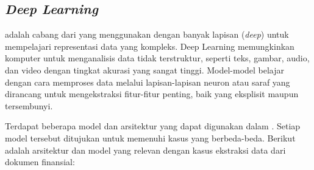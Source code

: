 \subsection{\emph{Deep Learning}}
\label{subsec:dl}

\dlfl{} adalah cabang dari \ml{} yang menggunakan \annfull{} dengan banyak lapisan (\emph{deep}) untuk mempelajari representasi data yang kompleks. Deep Learning memungkinkan komputer untuk menganalisis data tidak terstruktur, seperti teks, gambar, audio, dan video dengan tingkat akurasi yang sangat tinggi. Model-model \dl{} belajar dengan cara memproses data melalui lapisan-lapisan neuron atau saraf yang dirancang untuk mengekstraksi fitur-fitur penting, baik yang eksplisit maupun tersembunyi. \parencite{Goodfellow-et-al-2016}

Terdapat beberapa model dan arsitektur yang dapat digunakan dalam \dl. Setiap model tersebut ditujukan untuk memenuhi kasus yang berbeda-beda. Berikut adalah arsitektur dan model yang relevan dengan kasus ekstraksi data dari dokumen finansial: 

